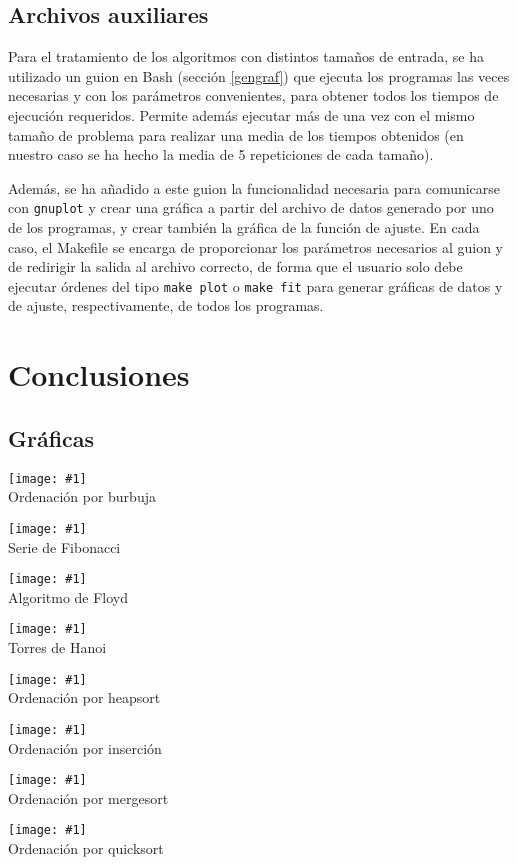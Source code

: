 \documentclass[a4paper, 11pt]{article} %
\newcommand{\imagen}[2]{\begin{figure*}[ht!] \centering  \texttt{[image: \#1]} \\ #2 \end{figure*}}
\begin{document}
\subsection{Archivos auxiliares}

Para el tratamiento de los algoritmos con distintos tamaños de entrada, se ha utilizado un guion en Bash (sección \ref{gengraf}) que ejecuta los programas las veces necesarias y con los parámetros convenientes, para obtener todos los tiempos de ejecución requeridos. Permite además ejecutar más de una vez con el mismo tamaño de problema para realizar una media de los tiempos obtenidos (en nuestro caso se ha hecho la media de 5 repeticiones de cada tamaño).

Además, se ha añadido a este guion la funcionalidad necesaria para comunicarse con \texttt{gnuplot} y crear una gráfica a partir del archivo de datos generado por uno de los programas, y crear también la gráfica de la función de ajuste. En cada caso, el Makefile se encarga de proporcionar los parámetros necesarios al guion y de redirigir la salida al archivo correcto, de forma que el usuario solo debe ejecutar órdenes del tipo \texttt{make plot} o \texttt{make fit} para generar gráficas de datos y de ajuste, respectivamente, de todos los programas.


\normalsize

\section {Conclusiones}
\subsection {Gráficas}
\imagen{../regressionPlots/burbuja_fit.jpg}{Ordenación por burbuja}

\imagen{../regressionPlots/fibonacci_fit.jpg}{Serie de Fibonacci}

\imagen{../regressionPlots/floyd_fit.jpg}{Algoritmo de Floyd}

\imagen{../regressionPlots/hanoi_fit.jpg}{Torres de Hanoi}

\imagen{../regressionPlots/heapsort_fit.jpg}{Ordenación por heapsort}

\imagen{../regressionPlots/insercion_fit.jpg}{Ordenación por inserción}

\imagen{../regressionPlots/mergesort_fit.jpg}{Ordenación por mergesort}

\imagen{../regressionPlots/quicksort_fit.jpg}{Ordenación por quicksort}
\end{document}
